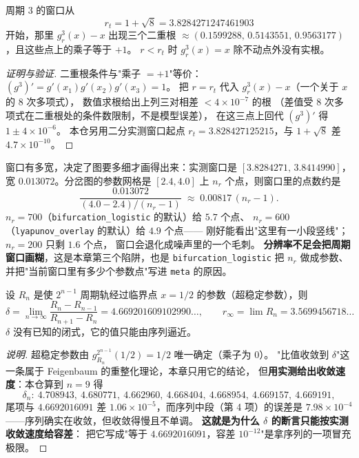 \begin{theorem}
\label{prop:window3}
周期 3 的窗口从
\begin{equation}
  r_t=1+\sqrt8=3.8284271247461903
  \label{eq:rt}
\end{equation}
开始，那里 $g_r^3(x)-x$ 出现三个二重根
$\approx(0.1599288,\,0.5143551,\,0.9563177)$，且这些点上的乘子等于 $+1$。
$r<r_t$ 时 $g_r^3(x)=x$ 除不动点外没有实根。
\end{theorem}

\begin{proof}[证明与验证]
二重根条件与"乘子 $=+1$"等价：$(g^3)'=g'(x_1)g'(x_2)g'(x_3)=1$。
把 $r=r_t$ 代入 $g_r^3(x)-x$（一个关于 $x$ 的 8 次多项式），
数值求根给出上列三对相差 $<4\times10^{-7}$ 的根
（差值受 8 次多项式在二重根处的条件数限制，不是模型误差），
在这三点上回代 $(g^3)'$ 得 $1\pm4\times10^{-6}$。
本仓另用二分实测窗口起点 $r_t=3.828427125215$，与 $1+\sqrt8$ 差 $4.7\times10^{-10}$。
\end{proof}

窗口有多宽，决定了图要多细才画得出来：实测窗口是
$[3.8284271,\,3.8414990]$，宽 $0.013072$。分岔图的参数网格是
$[2.4,4.0]$ 上 $n_r$ 个点，则窗口里的点数约是
\begin{equation}
  \frac{0.013072}{(4.0-2.4)/(n_r-1)}
  \;\approx\;
  0.00817\,(n_r-1).
  \label{eq:windowres}
\end{equation}
$n_r=700$（\texttt{bifurcation\_}\allowbreak\texttt{logistic} 的默认）给 $5.7$ 个点、
$n_r=600$（\texttt{lyapunov\_}\allowbreak\texttt{overlay} 的默认）给 $4.9$ 个点——
刚好能看出"这里有一小段竖线"；$n_r=200$ 只剩 $1.6$ 个点，
窗口会退化成噪声里的一个毛刺。
\textbf{分辨率不足会把周期窗口画糊}，这是本章第三个陷阱，也是
\texttt{bifurcation\_}\allowbreak\texttt{logistic} 把 $n_r$ 做成参数、
并把"当前窗口里有多少个参数点"写进 \texttt{meta} 的原因。

\begin{theorem}
\label{thm:feigenbaum}
设 $R_n$ 是使 $2^{n-1}$ 周期轨经过临界点 $x=1/2$ 的参数（超稳定参数），则
\begin{equation}
  \delta=\lim_{n\to\infty}\frac{R_n-R_{n-1}}{R_{n+1}-R_n}=4.669201609102990\ldots,
  \qquad
  r_\infty=\lim R_n=3.5699456718\ldots
  \label{eq:delta}
\end{equation}
$\delta$ 没有已知的闭式，它的值只能由序列逼近。
\end{theorem}

\begin{proof}[说明]
超稳定参数由 $g^{2^{n-1}}_{R_n}(1/2)=1/2$ 唯一确定（乘子为 $0$）。
"比值收敛到 $\delta$"这一条属于 Feigenbaum 的重整化理论，本章只用它的结论，
但\textbf{用实测给出收敛速度}：本仓算到 $n=9$ 得
\[
  \delta_n:\ 4.708943,\ 4.680771,\ 4.662960,\ 4.668404,\ 4.668954,\ 4.669157,\ 4.669191,
\]
尾项与 $4.6692016091$ 差 $1.06\times10^{-5}$，而序列中段（第 4 项）的误差是
$7.98\times10^{-4}$——序列确实在收敛，但收敛得慢且不单调。
\textbf{这就是为什么 $\delta$ 的断言只能按实测收敛速度给容差}：
把它写成"等于 $4.6692016091$，容差 $10^{-12}$"是拿序列的一项冒充极限。
\end{proof}

